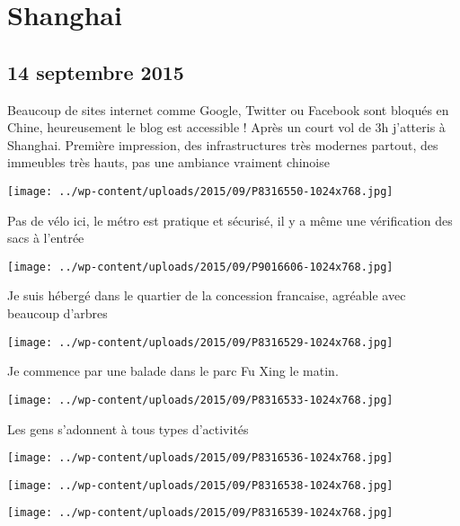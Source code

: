 \chapter{Shanghai}
\section*{14 septembre 2015}
Beaucoup de sites internet comme Google, Twitter ou Facebook sont bloqués en Chine, heureusement le blog est accessible ! \newline
 Après un court vol de 3h j'atteris à Shanghai. Première impression, des infrastructures très modernes partout, des immeubles très hauts, pas une ambiance vraiment chinoise \newline
 \newline
\centerline{\texttt{[image: ../wp-content/uploads/2015/09/P8316550-1024x768.jpg]} } 
 \newline
 Pas de vélo ici, le métro est pratique et sécurisé, il y a même une vérification des sacs à l'entrée \newline
 \newline
\centerline{\texttt{[image: ../wp-content/uploads/2015/09/P9016606-1024x768.jpg]} } 
 \newline
 Je suis hébergé dans le quartier de la concession francaise, agréable avec beaucoup d'arbres \newline
 \newline
\centerline{\texttt{[image: ../wp-content/uploads/2015/09/P8316529-1024x768.jpg]} } 
 \newline
 Je commence par une balade dans le parc Fu Xing le matin. \newline
 \newline
\centerline{\texttt{[image: ../wp-content/uploads/2015/09/P8316533-1024x768.jpg]} } 
 \newline
 Les gens s'adonnent à tous types d'activités \newline
 \newline
\centerline{\texttt{[image: ../wp-content/uploads/2015/09/P8316536-1024x768.jpg]} } 
 \newline
 \newline
\centerline{\texttt{[image: ../wp-content/uploads/2015/09/P8316538-1024x768.jpg]} } 
 \newline
 \newline
\centerline{\texttt{[image: ../wp-content/uploads/2015/09/P8316539-1024x768.jpg]} } 
 \newline
